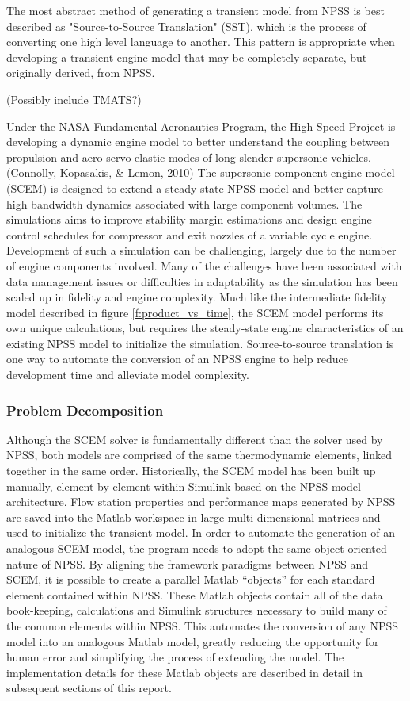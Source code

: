 \documentclass[heading.tex]{subfiles}
\begin{document}
The most abstract method of generating a transient model from NPSS is best described as "Source-to-Source Translation"
(SST), which is the process of converting one high level language to another. This pattern is appropriate when developing
a transient engine model that may be completely separate, but originally derived, from NPSS.


(Possibly include TMATS?)

	Under the NASA Fundamental Aeronautics Program, the High Speed Project is developing a dynamic engine model
to better understand the coupling between propulsion and  aero-servo-elastic modes of long slender
supersonic vehicles. (Connolly, Kopasakis, \& Lemon, 2010) The supersonic component engine model (SCEM) is 
designed to extend a steady-state NPSS model and better capture high bandwidth dynamics associated with large
component volumes. The simulations aims to improve stability margin estimations and design engine control schedules
for compressor and exit nozzles of a variable cycle engine. Development of such a simulation can be challenging,
largely due to the number of engine components involved. Many of the challenges have been associated with data
management issues or difficulties in adaptability as the simulation has been scaled up in fidelity and engine complexity. 
Much like the intermediate fidelity model described in figure \ref{f:product_vs_time}, the SCEM model performs its
own unique calculations, but requires the steady-state engine characteristics of an existing NPSS model to initialize
the simulation. Source-to-source translation is one way to automate the conversion of an NPSS engine to help
reduce development time and alleviate model complexity.

\subsubsection{Problem Decomposition}

Although the SCEM solver is fundamentally different than the solver used by NPSS, both models are comprised of 
the same thermodynamic elements, linked together in the same order. Historically, the SCEM model has been
built up manually, element-by-element within Simulink based on the NPSS model architecture. Flow station properties
and performance maps generated by NPSS are saved into the Matlab workspace in large multi-dimensional matrices
and used to initialize the transient model. In order to automate the generation of an analogous SCEM model, the
program needs to adopt the same object-oriented nature of NPSS. By aligning the framework
paradigms between NPSS and SCEM, it is possible to create a parallel Matlab “objects” for each
standard element contained within NPSS. These Matlab objects contain all of the data book-keeping,
calculations and Simulink structures necessary to build many of the common elements within NPSS.
This automates the conversion of any NPSS model into an analogous Matlab model, greatly reducing
the opportunity for human error and simplifying the process of extending the model. The implementation
details for these Matlab objects are described in detail in subsequent sections of this report.	
\end{document}
